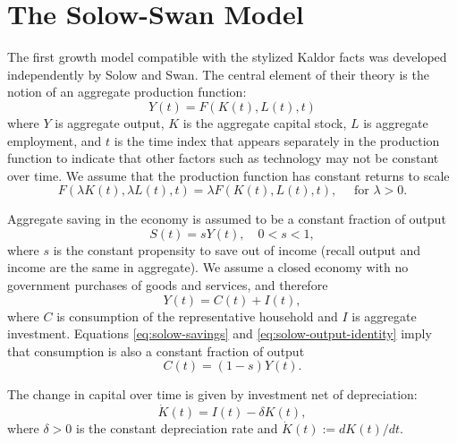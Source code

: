 \documentclass[\topdir/lecture\_notes.tex]{subfiles}
\begin{document}
\section{The Solow-Swan Model}

The first growth model compatible with the stylized Kaldor facts was developed independently by Solow and Swan.
The central element of their theory is the notion of an aggregate production function:
\begin{equation}
  Y(t)=F(K(t), L(t), t) \label{eq:solow-production-function}
\end{equation}
where $Y$ is aggregate output, $K$ is the aggregate capital stock, $L$ is aggregate employment, and $t$ is the time index that appears separately in the production function to indicate that other factors such as technology may not be constant over time.
We assume that the production function has constant returns to scale
\begin{equation}
  F(\lambda K(t), \lambda L(t), t)=\lambda F(K(t), L(t), t), \quad \text { for } \lambda>0. \label{eq:solow-constant-returns}
\end{equation}

Aggregate saving in the economy is assumed to be a constant fraction of output
\begin{equation}
  S(t)=s Y(t), \quad 0<s<1, \label{eq:solow-savings}
\end{equation}
where $s$ is the constant propensity to save out of income (recall output and income are the same in aggregate).
We assume a closed economy with no government purchases of goods and services, and therefore
\begin{equation}
  Y(t)=C(t)+I(t), \label{eq:solow-output-identity}
\end{equation}
where $C$ is consumption of the representative household and $I$ is aggregate investment.
Equations \eqref{eq:solow-savings} and \eqref{eq:solow-output-identity} imply that consumption is also a constant fraction of output
\begin{equation}
  C(t)= (1-s) Y(t). \label{eq:solow-consumption}
\end{equation}

The change in capital over time is given by investment net of depreciation:
\begin{equation}
  \dot{K}(t)=I(t)-\delta K(t), \label{eq:solow-capital-accumulation}
\end{equation}
where $\delta>0$ is the constant depreciation rate and $\dot{K}(t) := dK(t) / dt$.
\end{document}

